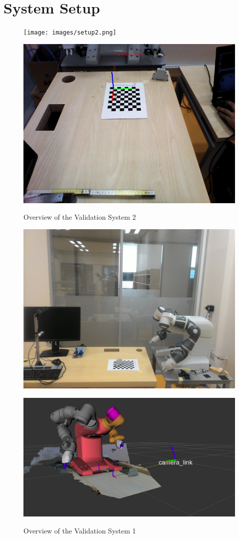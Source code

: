 \appendix
\chapter*{System Setup}
\label{chap:results}



\begin{figure}[htp]
\begin{center}
{
  \texttt{[image: images/setup2.png]}
}
\end{center}
\begin{center}
{
  \includegraphics[clip,width=0.6\columnwidth]{images/setup3.jpg}
}
\end{center}
\caption{Overview of the Validation System 2}
\label{setupsystem1}
\end{figure}



\begin{figure}[htp]
\begin{center}
{
  \includegraphics[clip,width=0.6\columnwidth]{images/setup1.jpg}
}
\end{center}
\begin{center}
{
  \includegraphics[clip,width=0.6\columnwidth]{images/system1.jpg}
}
\end{center}
\caption{Overview of the Validation System 1}
\label{setupsystem2}
\end{figure}







